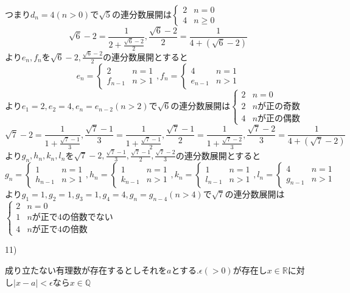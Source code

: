 \documentclass{jsarticle}
\begin{document}
つまり$d_n=4(n > 0)$で$\sqrt{5}$の連分数展開は$\begin{cases}
2 & n=0\\
4 & n\geq 0
\end{cases}$
\[\sqrt{6}-2=\frac{1}{2+\frac{\sqrt{6}-2}{2}},\frac{\sqrt{6}-2}{2}=\frac{1}{4+(\sqrt{6}-2)}\]
より$e_n,f_n$を$\sqrt{6}-2,\frac{\sqrt{6}-2}{2}$の連分数展開とすると\[e_n=\begin{cases}
2 & n=1\\
f_{n-1} & n>1
\end{cases},f_n=\begin{cases}
4 & n=1\\
e_{n-1} & n>1
\end{cases}\]
より$e_1=2,e_2=4,e_n = e_{n-2} (n>2)$で$\sqrt{6}$の連分数展開は$\begin{cases}
2 & n=0\\
2 & nが正の奇数 \\
4 & nが正の偶数
\end{cases}$
\[\sqrt{7}-2=\frac{1}{1+\frac{\sqrt{7}-1}{3}},\frac{\sqrt{7}-1}{3}=\frac{1}{1+\frac{\sqrt{7}-1}{2}},\frac{\sqrt{7}-1}{2}=\frac{1}{1+\frac{\sqrt{7}-2}{3}},\frac{\sqrt{7}-2}{3}=\frac{1}{4+(\sqrt{7}-2)}\]
より$g_n,h_n,k_n,l_n$を$\sqrt{7}-2,\frac{\sqrt{7}-1}{3},\frac{\sqrt{7}-1}{2},\frac{\sqrt{7}-2}{3}$の連分数展開とすると\[g_n=\begin{cases}
1 & n=1\\
h_{n-1} & n>1
\end{cases},h_n=\begin{cases}
1 & n=1\\
k_{n-1} & n>1
\end{cases},k_n=\begin{cases}
1 & n=1\\
l_{n-1} & n>1
\end{cases},l_n=\begin{cases}
4 & n=1\\
g_{n-1} & n>1
\end{cases}\]
より$g_1=1,g_2=1,g_3 =1, g_4=4,g_{n}=g_{n-4} (n>4)$で$\sqrt{7}$の連分数展開は$\begin{cases}
2 & n=0\\
1 & nが正で4の倍数でない \\
4 & nが正で4の倍数
\end{cases}$

11)

成り立たない有理数が存在するとしそれを$a$とする.$\epsilon (>0)$が存在し$x\in\mathbb{R}$に対し$|x-a|<\epsilon$なら$x\in\mathbb{Q}$
\end{document}
